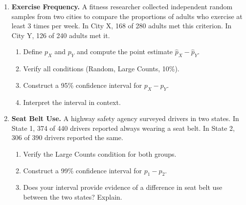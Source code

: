 \documentclass[10pt]{article}
\begin{document}
\namedateperiod

\vspace{0.15in}

\begin{enumerate}

\item \textbf{Exercise Frequency.} A fitness researcher collected independent random samples
from two cities to compare the proportions of adults who exercise at least 3 times per week.
In City X, 168 of 280 adults met this criterion. In City Y, 126 of 240 adults met it.

\begin{enumerate}[label=\alph*.]
  \item Define $p_X$ and $p_Y$ and compute the point estimate $\hat p_X - \hat p_Y$.
        \writeline
  \item Verify all conditions (Random, Large Counts, 10\%).
  \item Construct a 95\% confidence interval for $p_X - p_Y$.
  \item Interpret the interval in context.
\end{enumerate}

\item \textbf{Seat Belt Use.} A highway safety agency surveyed drivers in two states.
In State 1, 374 of 440 drivers reported always wearing a seat belt.
In State 2, 306 of 390 drivers reported the same.

\begin{enumerate}[label=\alph*.]
  \item Verify the Large Counts condition for both groups.
  \item Construct a 99\% confidence interval for $p_1 - p_2$.
  \item Does your interval provide evidence of a difference in seat belt use between the two states? Explain.
\end{enumerate}

\end{enumerate}
\end{document}
